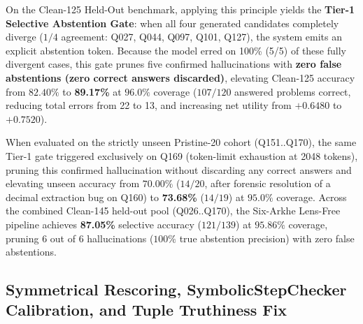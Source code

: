 \documentclass[11pt,a4paper]{article}
\begin{document}
On the Clean-125 Held-Out benchmark, applying this principle yields the \textbf{Tier-1 Selective Abstention Gate}: when all four generated candidates completely diverge ($1/4$ agreement: Q027, Q044, Q097, Q101, Q127), the system emits an explicit abstention token. Because the model erred on 100\% (5/5) of these fully divergent cases, this gate prunes five confirmed hallucinations with \textbf{zero false abstentions (zero correct answers discarded)}, elevating Clean-125 accuracy from $82.40\%$ to \textbf{89.17\%} at $96.0\%$ coverage ($107 / 120$ answered problems correct, reducing total errors from 22 to 13, and increasing net utility from $+0.6480$ to $+0.7520$).

When evaluated on the strictly unseen Pristine-20 cohort (Q151..Q170), the same Tier-1 gate triggered exclusively on Q169 (token-limit exhaustion at 2048 tokens), pruning this confirmed hallucination without discarding any correct answers and elevating unseen accuracy from $70.00\%$ ($14/20$, after forensic resolution of a decimal extraction bug on Q160) to \textbf{73.68\%} ($14/19$) at $95.0\%$ coverage. Across the combined Clean-145 held-out pool (Q026..Q170), the Six-Arkhe Lens-Free pipeline achieves \textbf{87.05\%} selective accuracy ($121 / 139$) at $95.86\%$ coverage, pruning 6 out of 6 hallucinations ($100\%$ true abstention precision) with zero false abstentions.

\subsection{Symmetrical Rescoring, SymbolicStepChecker Calibration, and Tuple Truthiness Fix}
\end{document}
